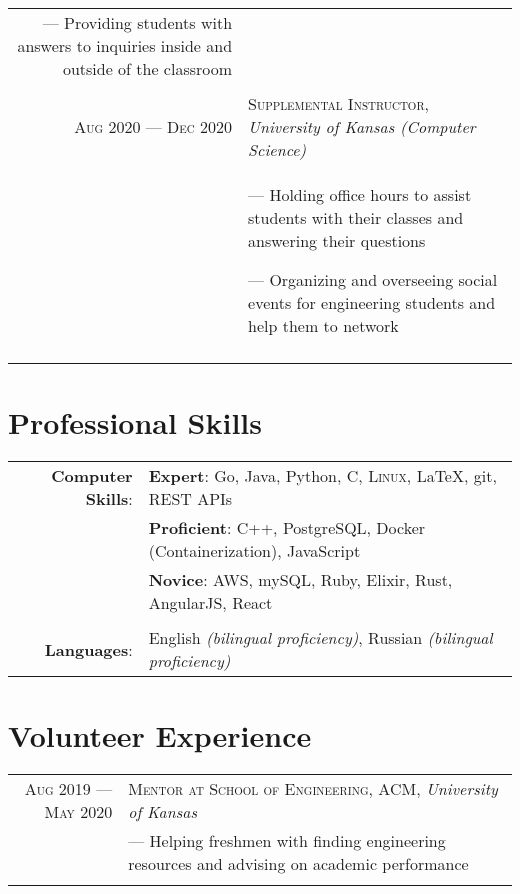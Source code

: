\documentclass[a4paper, 10pt]{article}
\begin{document}
\begin{tabular}{r|p{12cm}}
{		--- Providing students with answers to inquiries inside and outside of the classroom
	}                                                                                                                            \\\multicolumn{2}{c}{}\\
	

	\textsc{Aug 2020 --- Dec 2020}      & \textsc{Supplemental Instructor}, \emph{University of Kansas (Computer Science)}    \\&\footnotesize{
		--- Holding office hours to assist students with their classes and answering their questions

		--- Organizing and overseeing social events for engineering students and help them to network
	}                               \\\multicolumn{2}{c}{}\\

\end{tabular}

\section{Professional Skills}
\begin{tabular}{rl}
	\textbf{Computer Skills}: &
	\textbf{Expert}: Go, Java, Python, C, \textsc{Linux}, \LaTeX, git, REST APIs                               \\&
	\textbf{Proficient}: C++, PostgreSQL, Docker (Containerization), JavaScript                                \\&
	\textbf{Novice}: AWS, mySQL, Ruby, Elixir, Rust, AngularJS, React                                          \\\\

	\textbf{Languages}:       & English \emph{(bilingual proficiency)}, Russian \emph{(bilingual proficiency)} \\
\end{tabular}

\section{Volunteer Experience}
\begin{tabular}{r|p{12cm}}

	\textsc{Aug 2019 --- May 2020} & \textsc{Mentor at School of Engineering, ACM}, \emph{University of Kansas} \\&\footnotesize{
		--- Helping freshmen with finding engineering resources and advising on academic performance
	}                                                                                                           \\\multicolumn{2}{c}{}\\
\end{tabular}
\end{document}
